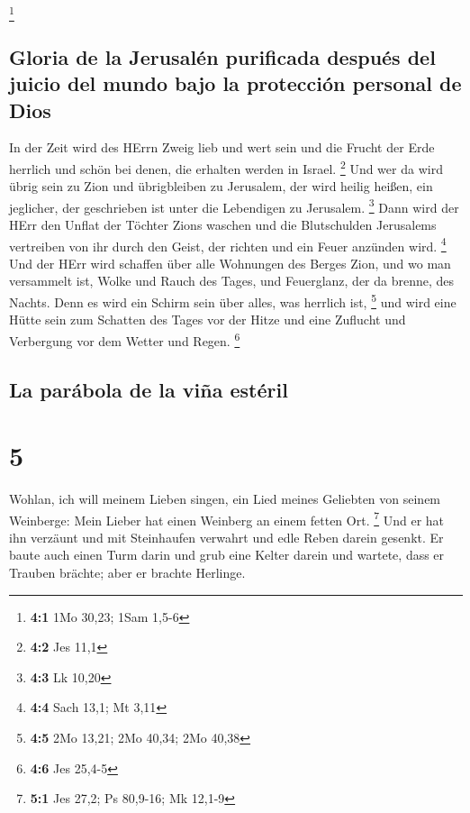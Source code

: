 \footnote{\textbf{4:1} 1Mo 30,23; 1Sam 1,5-6}

\hypertarget{gloria-de-la-jerusaluxe9n-purificada-despuuxe9s-del-juicio-del-mundo-bajo-la-protecciuxf3n-personal-de-dios}{%
\subsection{Gloria de la Jerusalén purificada después del juicio del
mundo bajo la protección personal de
Dios}\label{gloria-de-la-jerusaluxe9n-purificada-despuuxe9s-del-juicio-del-mundo-bajo-la-protecciuxf3n-personal-de-dios}}

 In der Zeit wird des HErrn Zweig lieb und wert sein und
die Frucht der Erde herrlich und schön bei denen, die erhalten werden in
Israel. \footnote{\textbf{4:2} Jes 11,1}  Und wer da wird
übrig sein zu Zion und übrigbleiben zu Jerusalem, der wird heilig
heißen, ein jeglicher, der geschrieben ist unter die Lebendigen zu
Jerusalem. \footnote{\textbf{4:3} Lk 10,20}  Dann wird der
HErr den Unflat der Töchter Zions waschen und die Blutschulden
Jerusalems vertreiben von ihr durch den Geist, der richten und ein Feuer
anzünden wird. \footnote{\textbf{4:4} Sach 13,1; Mt 3,11} 
Und der HErr wird schaffen über alle Wohnungen des Berges Zion, und wo
man versammelt ist, Wolke und Rauch des Tages, und Feuerglanz, der da
brenne, des Nachts. Denn es wird ein Schirm sein über alles, was
herrlich ist, \footnote{\textbf{4:5} 2Mo 13,21; 2Mo 40,34; 2Mo 40,38}
 und wird eine Hütte sein zum Schatten des Tages vor der
Hitze und eine Zuflucht und Verbergung vor dem Wetter und Regen.
\footnote{\textbf{4:6} Jes 25,4-5}

\hypertarget{la-paruxe1bola-de-la-viuxf1a-estuxe9ril}{%
\subsection{La parábola de la viña
estéril}\label{la-paruxe1bola-de-la-viuxf1a-estuxe9ril}}

\hypertarget{section-4}{%
\section{5}\label{section-4}}

 Wohlan, ich will meinem Lieben singen, ein Lied meines
Geliebten von seinem Weinberge: Mein Lieber hat einen Weinberg an einem
fetten Ort. \footnote{\textbf{5:1} Jes 27,2; Ps 80,9-16; Mk 12,1-9}
 Und er hat ihn verzäunt und mit Steinhaufen verwahrt und
edle Reben darein gesenkt. Er baute auch einen Turm darin und grub eine
Kelter darein und wartete, dass er Trauben brächte; aber er brachte
Herlinge.

